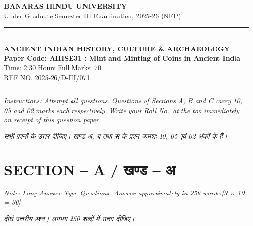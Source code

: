 \documentclass[11pt,a4paper]{article}
\newcommand{\pts}[1]{\hfill \textit{[#1]}}
\begin{document}
\begin{center}
  {\large\bfseries BANARAS HINDU UNIVERSITY}\\[2pt]
  {\normalsize Under Graduate Semester III Examination, 2025-26 (NEP)}\\[6pt]
  \rule{0.8\linewidth}{0.5pt}\\[6pt]
  {\large\bfseries ANCIENT INDIAN HISTORY, CULTURE \& ARCHAEOLOGY}\\[4pt]
  {\large\bfseries Paper Code: AIHSE31 : Mint and Minting of Coins in Ancient India}\\[4pt]
  {\normalsize Time: 2:30 Hours \hfill Full Marks: 70}\\[2pt]
  {\small REF NO. 2025-26/D-III/071}
\end{center}
\rule{\linewidth}{0.4pt}
\smallskip

\noindent \textit{Instructions: Attempt all questions. Questions of Sections A, B and C carry 10, 05 and 02 marks each respectively. Write your Roll No.\ at the top immediately on receipt of this question paper.}

\smallskip
\noindent \textit{सभी प्रश्नों के उत्तर दीजिए। खण्ड अ, ब तथा स के प्रश्न क्रमशः 10, 05 एवं 02 अंकों के हैं।}

\bigskip

\section*{SECTION -- A / खण्ड -- अ}
\noindent \textit{Note: Long Answer Type Questions. Answer approximately in 250 words.}\pts{3 $\times$ 10 = 30}

\noindent \textit{दीर्घ उत्तरीय प्रश्न। लगभग 250 शब्दों में उत्तर दीजिए।}
\end{document}
